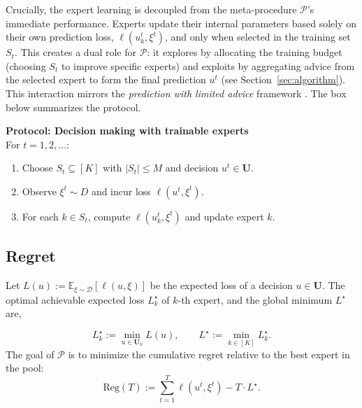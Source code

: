 \documentclass[a4paper,14pt]{extarticle}
\theoremstyle{plain}
\begin{document}
Crucially, the expert learning is decoupled from the meta-procedure $\mathcal{P}$'s immediate performance. Experts update their internal parameters based solely on their own prediction loss, $\ell(u_k^t, \xi^t)$, and only when selected in the training set $S_t$. This creates a dual role for $\mathcal{P}$: it explores by allocating the training budget (choosing $S_t$ to improve specific experts) and exploits by aggregating advice from the selected expert to form the final prediction $u^t$ (see Section~\ref{sec:algorithm}). This interaction mirrors the \emph{prediction with limited advice} framework \cite{seldin2014prediction}. The box below summarizes the protocol.
\begin{nframed}
\noindent
\textbf{Protocol: Decision making with trainable experts}\\[0.25em]
For $t=1,2,\dots$:
\begin{enumerate}[leftmargin=2em]
    \item Choose $S_t\subseteq[K]$ with $|S_t|\le M$ and decision $u^t\in\mathbf U$.
    \item Observe $\xi^t\sim D$ and incur loss $\ell(u^t,\xi^t)$.
    \item For each $k\in S_t$, compute $\ell(u_k^t,\xi^t)$ and update expert $k$.
\end{enumerate}
\end{nframed}



\subsection{Regret}
\label{sec:global-regret}
Let $L(u) := \mathbb{E}_{\xi \sim \mathcal{D}}[\ell(u,\xi)]$ be the expected loss of a decision $u \in \mathbf{U}$. The optimal achievable expected loss $L_k^\star$ of $k$-th expert, and the global minimum $L^\star$ are,

\begin{equation}
\label{def:expeted_smallest_loss}
L_k^\star := \min_{u \in \mathbf{U}_k} L(u),
\qquad
L^\star := \min_{k \in [K]} L_k^\star.
\end{equation}
The goal of $\mathcal{P}$ is to minimize the cumulative regret relative to the best expert in the pool:
\begin{equation}
\label{eq:regret}
\mathrm{Reg}(T) := \sum_{t=1}^T \ell(u^t, \xi^t) - T \cdot L^\star.
\end{equation}
\end{document}

